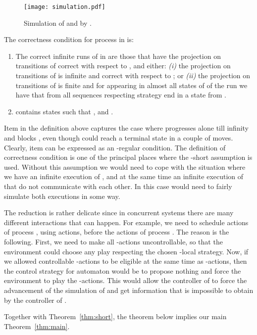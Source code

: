 \documentclass[10pt,a4paper]{article}
\newcommand{\igw}[1]{}
\begin{document}
\begin{figure}[tbp]
  \centering
\texttt{[image: simulation.pdf]}
  \caption{Simulation of  and  by .}\label{fig:simulation}
\end{figure}
The correctness condition for process  in  is:
\begin{enumerate}
\item The correct infinite runs of  in  are those that have
  the projection on transitions of  correct with respect to , and
  either: \emph{(i)} the projection on transitions of  is infinite and
  correct with respect to ; or \emph{(ii)} the projection on
  transitions of  is finite and for  appearing in almost
  all states of  of the run we have that from  all sequences
  respecting strategy  end in a state from .
\item  contains states  such that
  , and .
\end{enumerate}
Item  in the  definition above captures the case where  progresses alone till infinity and blocks
, even though  could reach a terminal state in a couple of
moves. Clearly, item  can be expressed as an -regular
condition. \igw{added some explanations} The definition of correctness condition is one of the
principal places where the -short assumption is used. Without this
assumption we would need to cope with the situation where we have an
infinite execution of , and at the same time an infinite
execution of  that do not communicate with each other. In this
case  would need to fairly simulate both executions in some way.





The reduction is rather delicate since in concurrent systems there are
many different interactions that can happen.  For example, we need to
schedule actions of process , using  actions, before the
actions of process . The reason is the following. First, we need to
make all -actions uncontrollable, so that the environment could
choose any play respecting the chosen -local strategy. Now, if we
allowed controllable -actions to be eligible at the same time as
-actions, then the control strategy for automaton  would
be to propose nothing and force the environment to play the
-actions. \igw{added some explanations} This would allow the
controller of  to force the advancement of the simulation of
 and get information that is impossible to obtain by the controller
of .

Together with Theorem~\ref{thm:short}, the theorem below implies 
our main
Theorem~\ref{thm:main}. 
\end{document}
